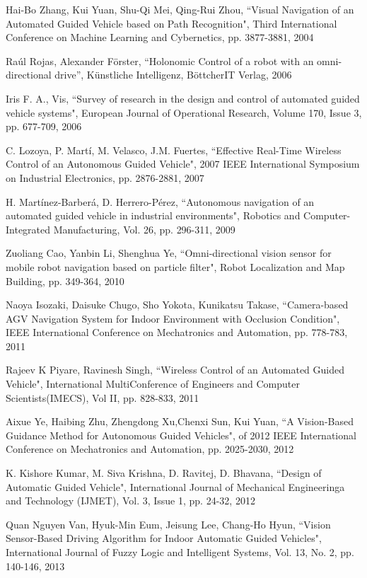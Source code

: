 \begin{thebibliography}{}
 Hai-Bo Zhang, Kui Yuan, Shu-Qi Mei, Qing-Rui Zhou, ``Visual Navigation of an Automated Guided Vehicle based on Path Recognition", Third International Conference on Machine Learning and Cybernetics, pp. 3877-3881, 2004

 Ra\'{u}l Rojas, Alexander F\"{o}rster, ``Holonomic Control of a robot with an omni-directional drive'', K\"{u}nstliche Intelligenz, B\"{o}ttcherIT Verlag, 2006 

 Iris F. A., Vis, ``Survey of research in the design and control of automated guided vehicle systems", European Journal of Operational Research, Volume 170, Issue 3, pp. 677-709, 2006

 C. Lozoya, P. Martí, M. Velasco, J.M. Fuertes, ``Effective Real-Time Wireless Control of an Autonomous Guided Vehicle", 2007 IEEE International Symposium on Industrial Electronics, pp. 2876-2881, 2007

 H. Mart\'{i}nez-Barber\'{a}, D. Herrero-P\'{e}rez, ``Autonomous navigation of an automated guided vehicle in industrial environments", Robotics and Computer-Integrated Manufacturing, Vol. 26, pp. 296-311, 2009 

 Zuoliang Cao, Yanbin Li, Shenghua Ye, ``Omni-directional vision sensor for mobile robot navigation based on particle filter", Robot Localization and Map Building, pp. 349-364, 2010

 Naoya Isozaki, Daisuke Chugo, Sho Yokota, Kunikatsu Takase, ``Camera-based AGV Navigation System for Indoor Environment with Occlusion Condition", IEEE International Conference on Mechatronics and Automation, pp. 778-783, 2011

 Rajeev K Piyare, Ravinesh Singh, ``Wireless Control of an Automated Guided
Vehicle", International MultiConference of Engineers and Computer Scientists(IMECS), Vol II, pp. 828-833, 2011

 Aixue Ye, Haibing Zhu, Zhengdong Xu,Chenxi Sun, Kui Yuan, ``A Vision-Based Guidance Method for Autonomous Guided Vehicles", of 2012 IEEE International Conference on Mechatronics and Automation, pp. 2025-2030, 2012

 K. Kishore Kumar, M. Siva Krishna, D. Ravitej, D. Bhavana, ``Design of Automatic Guided Vehicle", International Journal of Mechanical Engineeringa and Technology (IJMET), Vol. 3, Issue 1, pp. 24-32, 2012

 Quan Nguyen Van, Hyuk-Min Eum, Jeisung Lee, Chang-Ho Hyun, ``Vision Sensor-Based Driving Algorithm for Indoor Automatic Guided Vehicles", International Journal of Fuzzy Logic and Intelligent Systems, Vol. 13, No. 2, pp. 140-146, 2013


\end{thebibliography}

